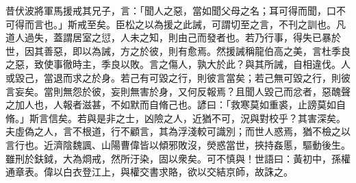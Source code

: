 \begin{pinyinscope}
昔伏波將軍馬援戒其兄子，言：「聞人之惡，當如聞父母之名；耳可得而聞，口不可得而言也。」斯戒至矣。臣松之以為援之此誡，可謂切至之言，不刊之訓也。凡道人過失，蓋謂居室之愆，人未之知，則由己而發者也。若乃行事，得失已暴於世，因其善惡，即以為誡，方之於彼，則有愈焉。然援誡稱龍伯高之美，言杜季良之惡，致使事徹時主，季良以敗。言之傷人，孰大於此？與其所誡，自相違伐。人或毀己，當退而求之於身。若己有可毀之行，則彼言當矣；若己無可毀之行，則彼言妄矣。當則無怨於彼，妄則無害於身，又何反報焉？且聞人毀己而忿者，惡醜聲之加人也，人報者滋甚，不如默而自脩己也。諺曰：「救寒莫如重裘，止謗莫如自脩。」斯言信矣。若與是非之士，凶險之人，近猶不可，況與對校乎？其害深矣。夫虛偽之人，言不根道，行不顧言，其為浮淺較可識別；而世人惑焉，猶不檢之以言行也。近濟陰魏諷、山陽曹偉皆以傾邪敗沒，熒惑當世，挾持姦慝，驅動後生。雖刑於鈇鉞，大為烱戒，然所汙染，固以衆矣。可不慎與！世語曰：黃初中，孫權通章表。偉以白衣登江上，與權交書求賂，欲以交結京師，故誅之。


\end{pinyinscope}
